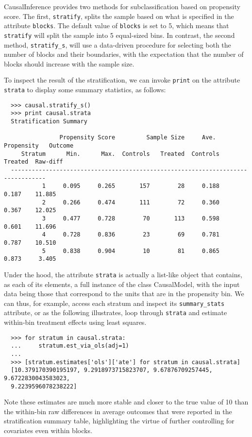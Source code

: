 \documentclass[12pt]{article}
\theoremstyle{definition}
\theoremstyle{definition}
\theoremstyle{definition}
\theoremstyle{remark}
\begin{document}
CausalInference provides two methods for subclassification based on propensity score. The first, \texttt{stratify}, splits the sample based on what is specified in the attribute \texttt{blocks}. The default value of \texttt{blocks} is set to 5, which means that \texttt{stratify} will split the sample into 5 equal-sized bins. In contrast, the second method, \texttt{stratify\_s}, will use a data-driven procedure for selecting both the number of blocks and their boundaries, with the expectation that the number of blocks should increase with the sample size.

To inspect the result of the stratification, we can invoke \texttt{print} on the attribute \texttt{strata} to display some summary statistics, as follows:
\begin{verbatim}
  >>> causal.stratify_s()
  >>> print causal.strata
  Stratification Summary
  
                Propensity Score         Sample Size     Ave. Propensity   Outcome
     Stratum      Min.      Max.  Controls   Treated  Controls   Treated  Raw-diff
  --------------------------------------------------------------------------------
           1     0.095     0.265       157        28     0.188     0.187    11.885
           2     0.266     0.474       111        72     0.360     0.367    12.025
           3     0.477     0.728        70       113     0.598     0.601    11.696
           4     0.728     0.836        23        69     0.781     0.787    10.510
           5     0.838     0.904        10        81     0.865     0.873     3.405
\end{verbatim}

Under the hood, the attribute \texttt{strata} is actually a list-like object that contains, as each of its elements, a full instance of the class CausalModel, with the input data being those that correspond to the units that are in the propensity bin. We can thus, for example, access each stratum and inspect its \texttt{summary\_stats} attribute, or as the following illustrates, loop through \texttt{strata} and estimate within-bin treatment effects using least squares.
\begin{verbatim}
  >>> for stratum in causal.strata:
  ...     stratum.est_via_ols(adj=1)
  ... 
  >>> [stratum.estimates['ols']['ate'] for stratum in causal.strata]
  [10.379170390195197, 9.2918973715823707, 9.67876709257445, 9.6722830043583023,
  9.2239596078238222]
\end{verbatim}

Note these estimates are much more stable and closer to the true value of 10 than the within-bin raw differences in average outcomes that were reported in the stratification summary table, highlighting the virtue of further controlling for covariates even within blocks.
\end{document}
